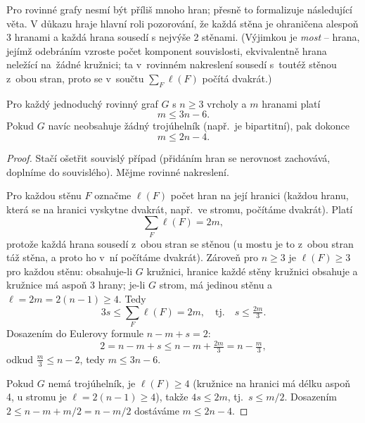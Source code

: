 \documentclass[11pt,a4paper]{article}
\begin{document}
Pro  rovinné grafy nesmí být příliš mnoho hran; přesně to formalizuje následující věta. V důkazu hraje hlavní roli pozorování, že každá stěna je ohraničena alespoň 3 hranami a každá hrana sousedí s nejvýše 2 stěnami. (Výjimkou je \emph{most} -- hrana, jejímž odebráním vzroste počet komponent souvislosti, ekvivalentně hrana neležící na~žádné kružnici; ta v~rovinném nakreslení sousedí s~toutéž stěnou z~obou stran, proto se v~součtu $\sum_F\ell(F)$ počítá dvakrát.)

\begin{veta}
Pro každý jednoduchý rovinný graf $G$ s $n\ge 3$ vrcholy a $m$ hranami platí
\[ m\le 3n-6. \]
Pokud $G$ navíc neobsahuje žádný trojúhelník (např.\ je bipartitní), pak dokonce
\[ m\le 2n-4. \]
\end{veta}

\begin{proof}
Stačí ošetřit souvislý případ (přidáním hran se nerovnost zachovává, doplníme do souvislého). Mějme rovinné nakreslení.

Pro každou stěnu $F$ označme $\ell(F)$ počet hran na její hranici (každou hranu, která se na hranici vyskytne dvakrát, např.\ ve stromu, počítáme dvakrát). Platí
\[ \sum_{F}\ell(F)=2m, \]
protože každá hrana sousedí z~obou stran se stěnou (u mostu je to z~obou stran táž stěna, a proto ho v~ní počítáme dvakrát). Zároveň pro $n\ge 3$ je $\ell(F)\ge 3$ pro každou stěnu: obsahuje-li $G$ kružnici, hranice každé stěny kružnici obsahuje a kružnice má aspoň 3 hrany; je-li $G$ strom, má jedinou stěnu a $\ell=2m=2(n-1)\ge 4$. Tedy
\[ 3s\le\sum_F\ell(F)=2m,\quad\text{tj.}\quad s\le\tfrac{2m}{3}. \]
Dosazením do Eulerovy formule $n-m+s=2$:
\[ 2=n-m+s\le n-m+\tfrac{2m}{3}=n-\tfrac{m}{3}, \]
odkud $\tfrac{m}{3}\le n-2$, tedy $m\le 3n-6$.

Pokud $G$ nemá trojúhelník, je $\ell(F)\ge 4$ (kružnice na hranici má délku aspoň 4, u stromu je $\ell=2(n-1)\ge 4$), takže $4s\le 2m$, tj.\ $s\le m/2$. Dosazením $2\le n-m+m/2=n-m/2$ dostáváme $m\le 2n-4$.
\end{proof}
\end{document}
